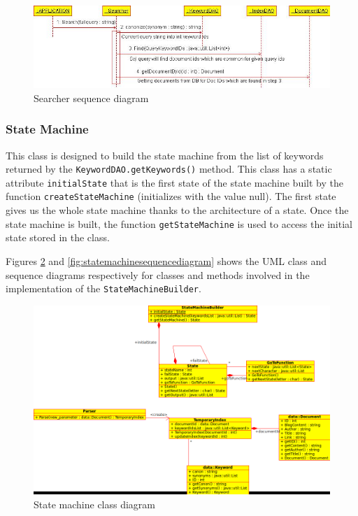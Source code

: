 \documentclass[10pt]{report}
\begin{document}
\begin{figure}
  \begin{center}
	\includegraphics[width=\textwidth,height=!]{searchersequencediagram}
  \end{center}
  \caption{Searcher sequence diagram}
  \label{fig:searchersequencediagram}
\end{figure} 


\subsubsection{State Machine}
This class is designed to build the state machine from the list of
keywords returned by the \texttt{KeywordDAO.getKeywords()} method. This class has a static
attribute \texttt{initialState} that is the first state of the state machine
built by the function \texttt{createStateMachine} (initializes with the value
null). The first state gives us the whole state machine thanks to the
architecture of a state. Once the state machine is built, the function
\texttt{getStateMachine} is used to access the initial state stored in the
class.

Figures \ref{fig:statemachineclassdiagram} and
\ref{fig:statemachinesequencediagram} shows the UML class and sequence
diagrams respectively for classes and methods involved in the
implementation of the \texttt{StateMachineBuilder}.

\begin{figure}
  \begin{center}
	\includegraphics[width=\textwidth,height=!]{statemachineclassdiagram}
  \end{center}
  \caption{State machine class diagram}
  \label{fig:statemachineclassdiagram}
\end{figure} 
\end{document}
